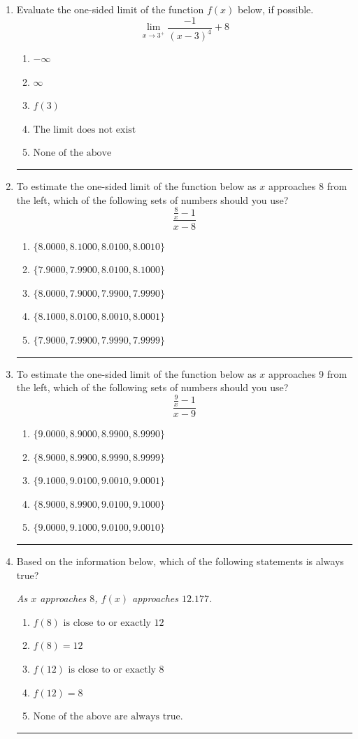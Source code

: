 \documentclass[14pt]{extbook}
\newcommand{\litem}[1]{\item#1\hspace*{-1cm}\rule{\textwidth}{0.4pt}}
\begin{document}
\begin{enumerate}
{\begin{enumerate}[label=\Alph*.]
\end{enumerate} }
\litem{
Evaluate the one-sided limit of the function $f(x)$ below, if possible.\[ \lim_{x \rightarrow 3^+} \frac{-1}{(x-3)^4}+8 \]\begin{enumerate}[label=\Alph*.]
\item \( -\infty \)
\item \( \infty \)
\item \( f(3) \)
\item \( \text{The limit does not exist} \)
\item \( \text{None of the above} \)

\end{enumerate} }
\litem{
To estimate the one-sided limit of the function below as $x$ approaches 8 from the left, which of the following sets of numbers should you use?\[ \frac{\frac{8}{x} - 1}{x - 8} \]\begin{enumerate}[label=\Alph*.]
\item \( \{ 8.0000, 8.1000, 8.0100, 8.0010 \} \)
\item \( \{ 7.9000, 7.9900, 8.0100, 8.1000 \} \)
\item \( \{ 8.0000, 7.9000, 7.9900, 7.9990 \} \)
\item \( \{ 8.1000, 8.0100, 8.0010, 8.0001 \} \)
\item \( \{ 7.9000, 7.9900, 7.9990, 7.9999 \} \)

\end{enumerate} }
\litem{
To estimate the one-sided limit of the function below as $x$ approaches 9 from the left, which of the following sets of numbers should you use?\[ \frac{\frac{9}{x} - 1}{x - 9} \]\begin{enumerate}[label=\Alph*.]
\item \( \{ 9.0000, 8.9000, 8.9900, 8.9990 \} \)
\item \( \{ 8.9000, 8.9900, 8.9990, 8.9999 \} \)
\item \( \{ 9.1000, 9.0100, 9.0010, 9.0001 \} \)
\item \( \{ 8.9000, 8.9900, 9.0100, 9.1000 \} \)
\item \( \{ 9.0000, 9.1000, 9.0100, 9.0010 \} \)

\end{enumerate} }
\litem{
Based on the information below, which of the following statements is always true?
\begin{center}
    \textit{ As $x$ approaches $8$, $f(x)$ approaches $12.177$. }
\end{center}
\begin{enumerate}[label=\Alph*.]
\item \( f(8) \text{ is close to or exactly } 12 \)
\item \( f(8) = 12 \)
\item \( f(12) \text{ is close to or exactly } 8 \)
\item \( f(12) = 8 \)
\item \( \text{None of the above are always true.} \)

\end{enumerate} }
\end{enumerate}
\end{document}
